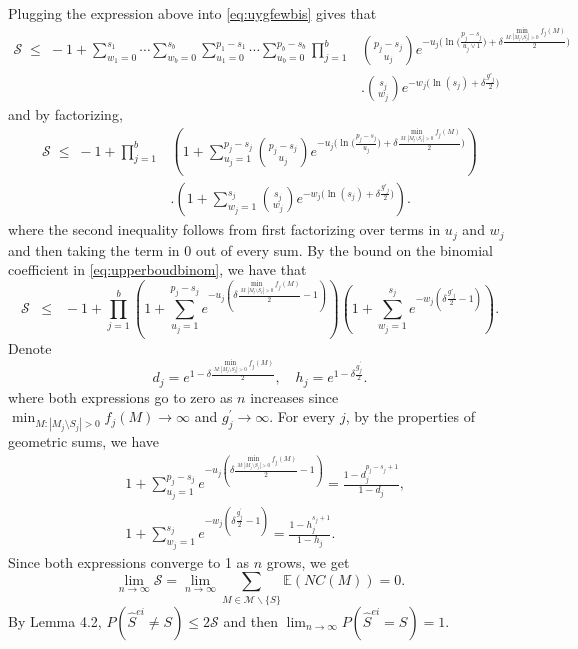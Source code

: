 \documentclass[
  12pt]{article}
\newcommand{\E}{\mathbb{E}}
\begin{document}
Plugging the expression above into \eqref{eq:uygfewbis} gives that
\begin{align*}
    \mathcal{S} 
    \;\leq\; -1+\sum_{w_1=0}^{s_1}\cdots\sum_{w_b=0}^{s_b}\sum_{u_1=0}^{p_1-s_1}\cdots\sum_{u_b=0}^{p_b-s_b}\prod_{j=1}^b & {\binom{p_j-s_j}{u_j}}e^{- u_j\big(\ln\big(\tfrac{p_j-s_j}{u_j\vee 1}\big)+\delta \tfrac{\min_{M: |M_j\setminus S_j|>0}f_j(M)}{2}\big)}\\&. {\binom{s_j}{w_j}}e^{-w_j\big(\ln(s_j)+\delta \tfrac{g'_j}{2}\big)}
\end{align*}
and by factorizing,
\begin{align*}
    \mathcal{S}\;\leq\; -1+ \prod_{j=1}^b&\left(1+\sum_{u_j=1}^{p_j-s_j}{\binom{p_j-s_j}{u_j}}e^{- u_j\big(\ln\big(\tfrac{p_j-s_j}{u_j}\big)+\delta \tfrac{\min_{M: |M_j\setminus S_j|>0}f_j(M)}{2}\big)}\right)\\&.\left(1+
    \sum_{w_j=1}^{s_j}{\binom{s_j}{w_j}}
    e^{-w_j\big(\ln(s_j)+\delta \tfrac{g'_j}{2}\big)}\right).
\end{align*}
where the second inequality follows from first factorizing over terms in $u_j$ and $w_j$ and then taking the term in 0 out of every sum.
By the bound on the binomial coefficient in \eqref{eq:upperboudbinom}, we have that
\begin{equation}\label{eq:upperbound_sumprobbis}
    \mathcal{S} \;\;\leq\;\; -1+\prod_{j=1}^b\left(1+\sum_{u_j=1}^{p_j-s_j}e^{-u_j\left(\delta \tfrac{\min_{M: |M_j\setminus S_j|>0}f_j(M)}{2}-1\right)}\right)\left(1+
    \sum_{w_j=1}^{s_j}    e^{-w_j\left(\delta \tfrac{g'_j}{2}-1\right)}\right).
\end{equation}
Denote
$$
d_j=e^{1-\delta \frac{\min_{M: |M_j\setminus S_j|>0}f_j(M)}{2}}, \quad h_j=e^{1-\delta \frac{g_j^{\prime}}{2}}.
$$
where both expressions go to zero as $n$ increases since $\min_{M: |M_j\setminus S_j|>0}f_j(M) \rightarrow \infty$ and $g_j^{\prime} \rightarrow \infty$. For every $j$, by the properties of geometric sums, we have
$$
\begin{aligned}
& 1+\sum_{u_j=1}^{p_j-s_j} e^{-u_j\left(\delta \frac{\min_{M: |M_j\setminus S_j|>0}f_j(M)}{2}-1\right)}=\frac{1-d_j^{p_j-s_j+1}}{1-d_j}, \\
& 1+\sum_{w_j=1}^{s_j} e^{-w_j\left(\delta \frac{g_j^{\prime}}{2}-1\right)}=\frac{1-h_j^{s_j+1}}{1-h_j}.
\end{aligned}
$$
Since both expressions converge to 1 as $n$ grows, we get $$\lim _{n \rightarrow \infty} \mathcal{S}=\lim _{n \rightarrow \infty} \sum_{M \in \mathcal{M} \backslash\{S\}}\E(NC(M))=0.$$ By Lemma 4.2, $P\left(\hat{S}^{ei} \neq S\right) \leq 2 \mathcal{S}$ and then $\lim _{n \rightarrow \infty} P\left(\hat{S}^{ei}=S\right)=1$.
\end{document}
